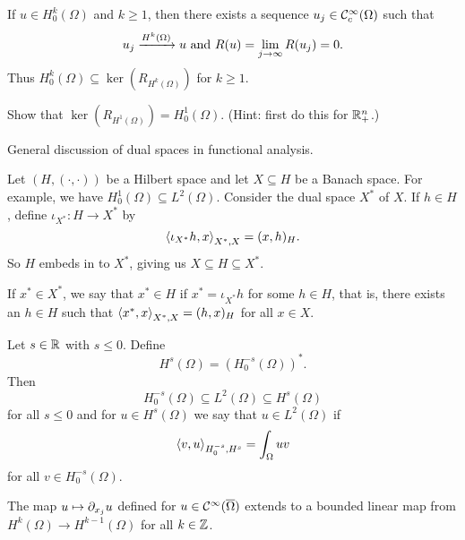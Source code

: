 If $u\in H_0^k(\Omega)$ and $k\geq1$, then there exists a sequence $u_j\in\mathcal{C}_c^\infty(\Omega)$ such that
\[ u_j \xrightarrow{H^k(\Omega)} u \text{ and } R(u) = \lim_{j\to\infty}R(u_j)=0. \]
Thus $H_0^k(\Omega) \subseteq \ker(R_{H^k(\Omega)})$ for $k\geq1$.

\begin{exer}\label{13:ker}
  Show that $\ker(R_{H^1(\Omega)})=H_0^1(\Omega)$.
  (Hint: first do this for $\mathbb{R}_+^n$.)
\end{exer}

General discussion of dual spaces in functional analysis.

Let $(H,(\cdot,\cdot))$ be a Hilbert space and let $X \subseteq H$ be a Banach space.
For example, we have $H_0^1(\Omega) \subseteq L^2(\Omega)$.
Consider the dual space $X^*$ of $X$.
If $h \in H$, define $\iota_{X^*}: H \to X^*$ by
\[ {\left\langle \iota_{X^*}h,x \right\rangle}_{X^*,X} = (x,h)_H. \]
So $H$ embeds in to $X^*$, giving us $X \subseteq H \subseteq X^*$.

If $x^* \in X^*$, we say that $x^* \in H$ if $x^* = \iota_{X^*} h$ for some $h \in H$, that is, there exists an $h \in H$ such that ${\left\langle x^*,x \right\rangle}_{X^*,X} = (h,x)_H$ for all $x \in X$.

\begin{defn}
  Let $s\in\mathbb{R}$ with $s\leq0$.
  Define
  \[ H^s(\Omega) = \left( H_0^{-s}(\Omega) \right)^*. \]
  Then
  \[ H_0^{-s}(\Omega) \subseteq L^2(\Omega) \subseteq H^s(\Omega) \]
  for all $s\leq0$ and for $u\in H^s(\Omega)$ we say that $u\in L^2(\Omega)$ if
  \[ {\left\langle v,u \right\rangle}_{H_0^{-s},H^s} = \int_\Omega uv \]
  for all $v \in H_0^{-s}(\Omega)$.
\end{defn}

\begin{prop}[Differentiation]
  The map $u \mapsto \partial_{x_j}u$ defined for $u\in\mathcal{C}^\infty(\overline\Omega)$ extends to a bounded linear map from $H^k(\Omega) \to H^{k-1}(\Omega)$ for all $k\in\mathbb{Z}$.
\end{prop}

